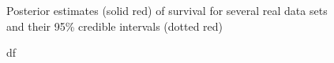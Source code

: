 \documentclass[
  sn-basic,
]{sn-jnl}
\theoremstyle{plain}
\theoremstyle{remark}
\begin{document}
\begin{figure}[H]


\caption{\label{fig-shapes}Posterior estimates (solid red) of survival
for several real data sets and their 95\% credible intervals (dotted
red)}

\end{figure}%

\begin{figure}[H]


\caption{\label{fig-pa}df}

\end{figure}%
\end{document}
